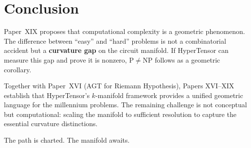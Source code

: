 \documentclass{article}
\begin{document}
\section{Conclusion}
\label{sec:conclusion}

Paper~XIX proposes that computational complexity is a geometric phenomenon.
The difference between ``easy'' and ``hard'' problems is not a combinatorial
accident but a \textbf{curvature gap} on the circuit manifold.  If HyperTensor
can measure this gap and prove it is nonzero, $\mathrm{P} \neq \mathrm{NP}$
follows as a geometric corollary.

Together with Paper~XVI (AGT for Riemann Hypothesis), Papers XVI--XIX establish
that HyperTensor's $k$-manifold framework provides a unified geometric language
for the millennium problems.  The remaining challenge is not conceptual but
computational: scaling the manifold to sufficient resolution to capture the
essential curvature distinctions.

The path is charted.  The manifold awaits.
\end{document}
